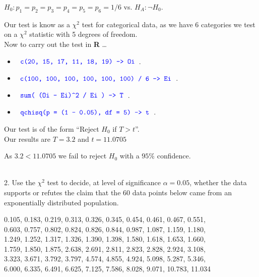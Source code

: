 \documentclass[12pt]{article}
\newcommand{\XB}{\color{black}}
\newcommand{\XBB}{\color{blue}}
\newcommand{\ds}{\displaystyle}
\begin{document}
\begin{center}
    $ H_{0} : p_{1} = p_{2} = p_{3} = p_{4} = p_{5} = p_{6} = 1/6 $ vs. $ H_{A} : \lnot H_{0} $. \\
\end{center} 

\noindent
Our test is know as a $ \chi^{2} $ test for categorical data, 
as we have 6 categories we test on a $ \chi^{2} $ statistic with 5 degrees of freedom. \\

\noindent
Now to carry out the test in \textbf{R} \dots \\

\begin{itemize}
    \item $ \ds {\XBB \texttt{ c(20, 15, 17, 11, 18, 19) -> Oi }} $.
    \item $ \ds {\XBB \texttt{ c(100, 100, 100, 100, 100, 100) / 6 -> Ei }} $.
    \item $ \ds {\XBB \texttt{ sum( (Oi - Ei)} \verb|^| \texttt{2 / Ei ) -> T }} $.
    \item $ \ds {\XBB \texttt{ qchisq(p = (1 - 0.05), df = 5) -> t }} $. \\
\end{itemize}

\noindent
Our test is of the form ``Reject $ H_{0} $ if $ T > t $''. \\

Our results are $ T = 3.2 $ and $ t = 11.0705 $

As $ 3.2 < 11.0705 $ we fail to reject $ H_{0} $ with a $ 95\% $ confidence. 

\vspace{2.5mm}

\newpage
\XBB\hrulefill\XB \\

2. Use the $ \chi^{2} $ test to decide, at level of significance $ \alpha = 0.05 $, whether the data supports
or refutes the claim that the 60 data points below came from an exponentially distributed population.  \\

\begin{center}
    0.105, 0.183, 0.219, 0.313, 0.326, 0.345, 0.454, 0.461, 0.467, 0.551, \\
    0.603, 0.757, 0.802, 0.824, 0.826, 0.844, 0.987, 1.087, 1.159, 1.180, \\
    1.249, 1.252, 1.317, 1.326, 1.390, 1.398, 1.580, 1.618, 1.653, 1.660, \\
    1.759, 1.850, 1.875, 2.638, 2.691, 2.811, 2.823, 2.828, 2.924, 3.108, \\
    3.323, 3.671, 3.792, 3.797, 4.574, 4.855, 4.924, 5.098, 5.287, 5.346, \\
    6.000, 6.335, 6.491, 6.625, 7.125, 7.586, 8.028, 9.071, 10.783, 11.034 
\end{center}
\end{document}
